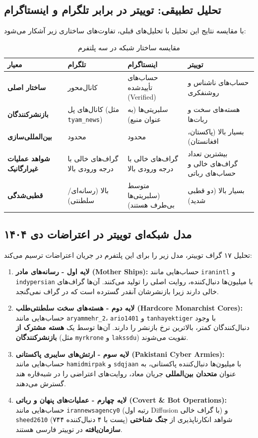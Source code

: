 \documentclass{article}
\begin{document}
\subsection{تحلیل تطبیقی: توییتر در برابر تلگرام و اینستاگرام}
با مقایسه نتایج این تحلیل با تحلیل‌های قبلی، تفاوت‌های ساختاری زیر آشکار می‌شود:

\begin{longtable}{l p{3.5cm} p{3.5cm} p{3.5cm}}
	\caption{مقایسه ساختار شبکه در سه پلتفرم}
	\label{tab:final_comparison} \\
	\toprule
	\textbf{معیار} & \textbf{تلگرام} & \textbf{اینستاگرام} & \textbf{توییتر} \\
	\midrule
	\textbf{ساختار اصلی} & کانال‌محور & حساب‌های تأییدشده (Verified) & حساب‌های ناشناس و روشنفکری \\
	\textbf{بازنشرکنندگان} & کانال‌های پل (مثل \texttt{tyam\_news}) & سلبریتی‌ها (به عنوان منبع) & هسته‌های سخت و ربات‌ها \\
	\textbf{بین‌المللی‌سازی} & محدود & محدود & بسیار بالا (پاکستان، افغانستان) \\
	\textbf{شواهد عملیات غیرارگانیک} & گراف‌های خالی با درجه ورودی بالا & گراف‌های خالی با درجه ورودی بالا & بیشترین تعداد گراف‌های خالی و حساب‌های رباتی \\
	\textbf{قطبی‌شدگی} & بالا (رسانه‌ای/سلطنتی) & متوسط (سلبریتی‌ها بی‌طرف هستند) & بسیار بالا (دو قطبی شدید) \\
	\bottomrule
\end{longtable}

\subsection{ مدل شبکه‌ای توییتر در اعتراضات دی ۱۴۰۴}
تحلیل ۱۷ گراف توییتر، مدل زیر را برای این پلتفرم در جریان اعتراضات ترسیم می‌کند:

\begin{enumerate}
	\item \textbf{لایه اول - رسانه‌های مادر (Mother Ships):} حساب‌هایی مانند \texttt{iranintl} و \texttt{indypersian} با میلیون‌ها دنبال‌کننده، روایت اصلی را تولید می‌کنند. آن‌ها گراف‌های خالی دارند زیرا بازنشرشان آنقدر گسترده است که در گراف نمی‌گنجد.
	\item \textbf{لایه دوم - هسته‌های سخت سلطنتی‌طلب (Hardcore Monarchist Cores):} حساب‌هایی مانند \texttt{aryammehr\_2}، \texttt{ario1401} و \texttt{tanhayektiger} با وجود دنبال‌کنندگان کمتر، بالاترین نرخ بازنشر را دارند. آن‌ها توسط یک \textbf{هسته مشترک از بازنشرکنندگان} (مثل \texttt{myrkrone} و \texttt{lakssdu}) تقویت می‌شوند.
	\item \textbf{لایه سوم - ارتش‌های سایبری پاکستانی (Pakistani Cyber Armies):} حساب‌هایی مانند \texttt{hamidmirpak} و \texttt{sdqjaan} با میلیون‌ها دنبال‌کننده پاکستانی، به عنوان \textbf{متحدان بین‌المللی} جریان معاد، روایت‌های اعتراضی را در شبه‌قاره هند گسترش می‌دهند.
	\item \textbf{لایه چهارم - عملیات‌های پنهان و رباتی (Covert \& Bot Operations):} حساب‌هایی مانند \texttt{irannewsagency0} (رتبه اول Diffusion با گراف خالی) و \texttt{sheed2610} (۷۴۴ پست با ۴ دنبال‌کننده) شواهد انکارناپذیری از \textbf{جنگ شناختی سازمان‌یافته} در توییتر فارسی هستند.
\end{enumerate}
\end{document}
